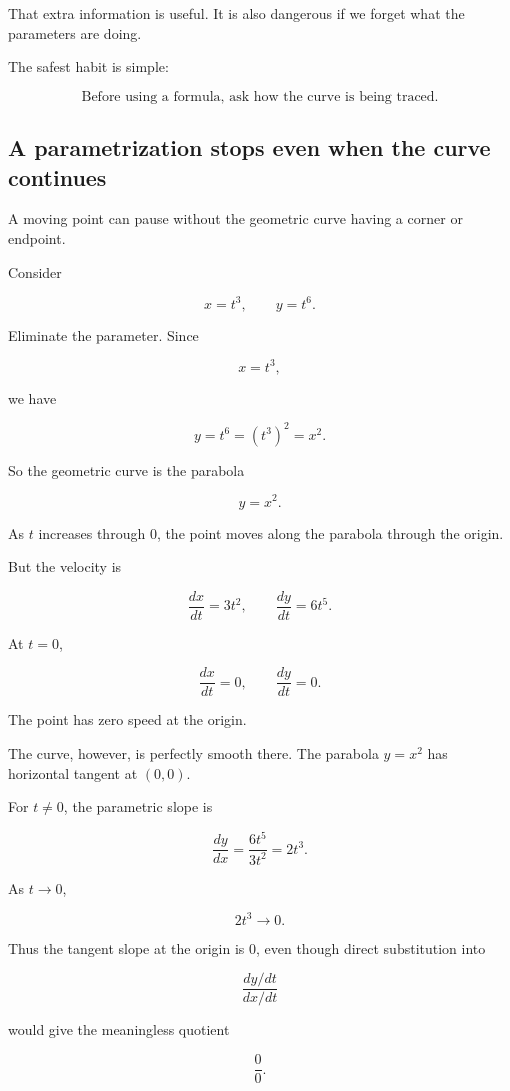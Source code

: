 That extra information is useful.  It is also dangerous if we forget what the
parameters are doing.

The safest habit is simple:

\[
\boxed{
\text{Before using a formula, ask how the curve is being traced.}
}
\]

\subsection{A parametrization stops even when the curve continues}
\label{subsec:parametrization-stops-curve-continues}

A moving point can pause without the geometric curve having a corner or endpoint.

Consider

\[
x=t^3,
\qquad
y=t^6.
\]

Eliminate the parameter.  Since

\[
x=t^3,
\]

we have

\[
y=t^6=(t^3)^2=x^2.
\]

So the geometric curve is the parabola

\[
y=x^2.
\]

As \(t\) increases through \(0\), the point moves along the parabola through the
origin.

But the velocity is

\[
\frac{dx}{dt}=3t^2,
\qquad
\frac{dy}{dt}=6t^5.
\]

At \(t=0\),

\[
\frac{dx}{dt}=0,
\qquad
\frac{dy}{dt}=0.
\]

The point has zero speed at the origin.

The curve, however, is perfectly smooth there.  The parabola \(y=x^2\) has horizontal
tangent at \((0,0)\).

For \(t\neq0\), the parametric slope is

\[
\frac{dy}{dx}
=
\frac{6t^5}{3t^2}
=
2t^3.
\]

As \(t\to0\),

\[
2t^3\to0.
\]

Thus the tangent slope at the origin is \(0\), even though direct substitution into

\[
\frac{dy/dt}{dx/dt}
\]

would give the meaningless quotient

\[
\frac00.
\]

